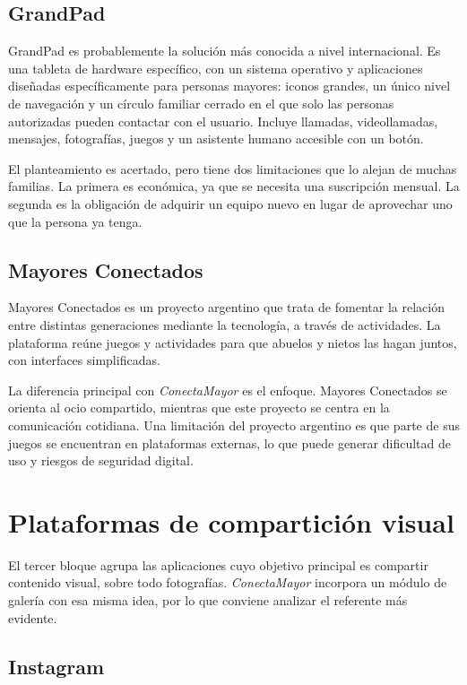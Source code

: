 \subsection{GrandPad}

GrandPad \cite{grandpad} es probablemente la solución más conocida a nivel
internacional. Es una tableta de hardware específico, con un sistema
operativo y aplicaciones diseñadas específicamente para personas mayores:
iconos grandes, un único nivel de navegación y un círculo familiar cerrado
en el que solo las personas autorizadas pueden contactar con el usuario.
Incluye llamadas, videollamadas, mensajes, fotografías, juegos y un
asistente humano accesible con un botón.

El planteamiento es acertado, pero tiene dos limitaciones que lo alejan de
muchas familias. La primera es económica, ya que se necesita una suscripción mensual. La segunda es la obligación de adquirir un equipo nuevo en lugar de aprovechar uno que
la persona ya tenga.

\subsection{Mayores Conectados}

Mayores Conectados \cite{mayoresconectados} es un proyecto argentino que trata de fomentar la relación entre distintas generaciones mediante la tecnología, a través de actividades. La plataforma reúne juegos y
actividades para que abuelos y nietos las hagan juntos, con interfaces
simplificadas.

La diferencia principal con \emph{ConectaMayor} es el enfoque. Mayores
Conectados se orienta al ocio compartido, mientras que este proyecto se
centra en la comunicación cotidiana. Una limitación del proyecto argentino es que parte de sus
juegos se encuentran en plataformas externas, lo que puede generar dificultad de uso y riesgos de seguridad digital.


\section{Plataformas de compartición visual\label{SEC:EA_VISUALES}}

El tercer bloque agrupa las aplicaciones cuyo objetivo principal es compartir
contenido visual, sobre todo fotografías. \emph{ConectaMayor} incorpora un
módulo de galería con esa misma idea, por lo que conviene analizar
el referente más evidente.

\subsection{Instagram}


